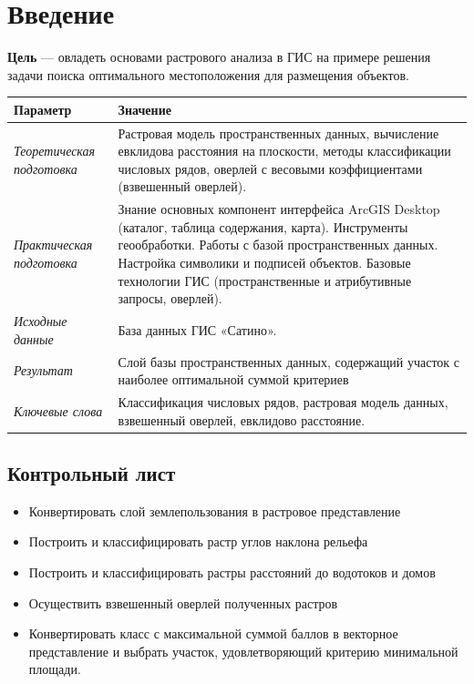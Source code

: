 \documentclass[]{book}
\providecommand{\tightlist}{%
  \setlength{\itemsep}{0pt}\setlength{\parskip}{0pt}}
\theoremstyle{definition}
\theoremstyle{definition}
\theoremstyle{definition}
\theoremstyle{remark}
\begin{document}
\hypertarget{weighted-overlay-intro}{%
\section{Введение}\label{weighted-overlay-intro}}

\textbf{Цель} --- овладеть основами растрового анализа в ГИС на примере
решения задачи поиска оптимального местоположения для размещения
объектов.

\begin{longtable}[]{@{}ll@{}}
\toprule
Параметр & Значение\tabularnewline
\midrule
\endhead
\emph{Теоретическая подготовка} & Растровая модель пространственных
данных, вычисление евклидова расстояния на плоскости, методы
классификации числовых рядов, оверлей с весовыми коэффициентами
(взвешенный оверлей).\tabularnewline
\emph{Практическая подготовка} & Знание основных компонент интерфейса
ArcGIS Desktop (каталог, таблица содержания, карта). Инструменты
геообработки. Работы с базой пространственных данных. Настройка
символики и подписей объектов. Базовые технологии ГИС (пространственные
и атрибутивные запросы, оверлей).\tabularnewline
\emph{Исходные данные} & База данных ГИС «Сатино».\tabularnewline
\emph{Результат} & Слой базы пространственных данных, содержащий участок
с наиболее оптимальной суммой критериев\tabularnewline
\emph{Ключевые слова} & Классификация числовых рядов, растровая модель
данных, взвешенный оверлей, евклидово расстояние.\tabularnewline
\bottomrule
\end{longtable}

\hypertarget{weighted-overlay-control}{%
\subsection{Контрольный лист}\label{weighted-overlay-control}}

\begin{itemize}
\tightlist
\item
  Конвертировать слой землепользования в растровое представление
\item
  Построить и классифицировать растр углов наклона рельефа
\item
  Построить и классифицировать растры расстояний до водотоков и домов
\item
  Осуществить взвешенный оверлей полученных растров
\item
  Конвертировать класс с максимальной суммой баллов в векторное
  представление и выбрать участок, удовлетворяющий критерию минимальной
  площади.
\end{itemize}
\end{document}
